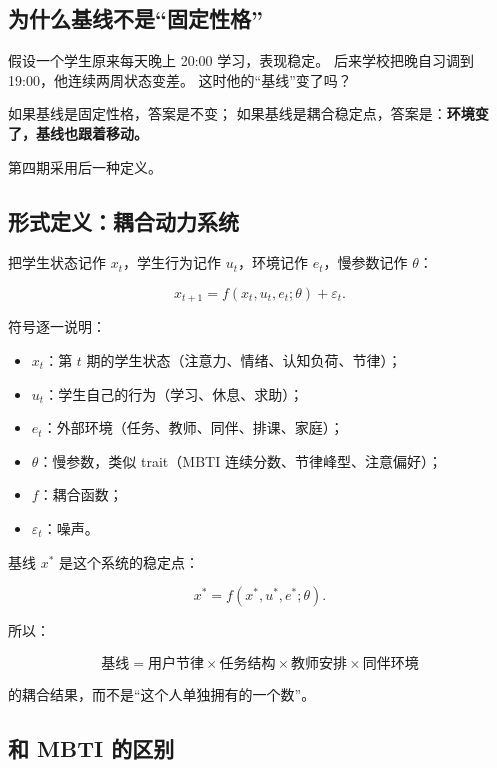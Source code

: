 \documentclass[UTF8,a4paper,11pt]{ctexart}
\begin{document}
\subsection{为什么基线不是“固定性格”}

假设一个学生原来每天晚上 20:00 学习，表现稳定。
后来学校把晚自习调到 19:00，他连续两周状态变差。
这时他的“基线”变了吗？

如果基线是固定性格，答案是不变；
如果基线是耦合稳定点，答案是：\textbf{环境变了，基线也跟着移动。}

第四期采用后一种定义。

\subsection{形式定义：耦合动力系统}

把学生状态记作 $x_t$，学生行为记作 $u_t$，环境记作 $e_t$，慢参数记作 $\theta$：

\begin{equation}
x_{t+1}=f(x_t,u_t,e_t;\theta)+\varepsilon_t.
\end{equation}

符号逐一说明：

\begin{itemize}[leftmargin=2em]
\item $x_t$：第 $t$ 期的学生状态（注意力、情绪、认知负荷、节律）；
\item $u_t$：学生自己的行为（学习、休息、求助）；
\item $e_t$：外部环境（任务、教师、同伴、排课、家庭）；
\item $\theta$：慢参数，类似 trait（MBTI 连续分数、节律峰型、注意偏好）；
\item $f$：耦合函数；
\item $\varepsilon_t$：噪声。
\end{itemize}

基线 $x^*$ 是这个系统的稳定点：

\begin{equation}
x^*=f(x^*,u^*,e^*;\theta).
\end{equation}

所以：

\begin{equation}
\text{基线}=\text{用户节律}\times\text{任务结构}\times\text{教师安排}\times\text{同伴环境}
\end{equation}

的耦合结果，而不是“这个人单独拥有的一个数”。

\subsection{和 MBTI 的区别}
\end{document}
